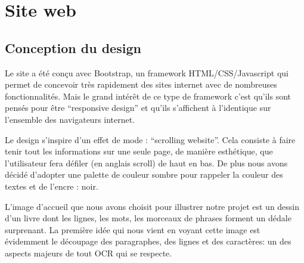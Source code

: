 \documentclass[11pt]{report}
\begin{document}
\chapter{Site web}

\section{Conception du design}

Le site a été conçu avec Bootstrap, un framework HTML/CSS/Javascript qui permet de concevoir très rapidement des sites internet avec de nombreuses fonctionnalités. Mais le grand intérêt de ce type de framework c’est qu’ils sont pensés pour être “responsive design” et qu’ils s’affichent à l’identique sur l’ensemble des navigateurs internet.

Le design s'inspire d'un effet de mode : ``scrolling website''. Cela consiste à faire tenir tout les informations sur une seule page, de manière esthétique, que l'utilisateur fera défiler (en anglais scroll) de haut en bas. De plus nous avons décidé d'adopter une palette de couleur sombre pour rappeler la couleur des textes et de l'encre : noir.

L'image d'accueil que nous avons choisit pour illustrer notre projet est un dessin d'un livre dont les lignes, les mots, les morceaux de phrases forment un dédale surprenant. La première idée qui nous vient en voyant cette image est évidemment le découpage des paragraphes, des lignes et des caractères: un des aspects majeurs de tout OCR qui se respecte.
\end{document}
